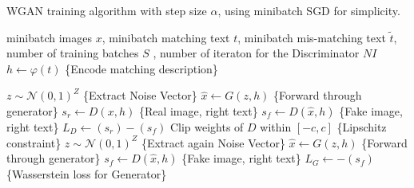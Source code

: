 \begin{algorithm}
    \caption{WGAN training algorithm with step size $\alpha$, using minibatch SGD for simplicity.}
    \begin{algorithmic}
        \Require minibatch images $x$, minibatch matching text $t$, minibatch mis-matching text $\tilde{t}$, 
        number of training batches $S$ , number of iteraton for the Discriminator $NI$ 
            \State $h \leftarrow \varphi(t)$ \hfill \{Encode matching description\}
            
                \State $z \sim \mathcal{N}(0, 1)^Z$ \hfill \{Extract Noise Vector\}
                \State $\hat{x} \leftarrow G(z, h)$ \hfill \{Forward through generator\}
                \State $s_r \leftarrow D(x, h)$ \hfill \{Real image, right text\}
                \State $s_f \leftarrow D(\hat{x}, h)$ \hfill \{Fake image, right text\}
                \State $L_D \leftarrow (s_r) - (s_f) $
                \State Clip weights of $D$ within $[-c, c]$
                \State \{Lipschitz constraint\}
            \EndFor
            \State $z \sim \mathcal{N}(0, 1)^Z$ \hfill \{Extract again Noise Vector\}
            \State $\hat{x} \leftarrow G(z, h)$ \hfill \{Forward through generator\}
            \State $s_f \leftarrow D(\hat{x}, h)$ \hfill \{Fake image, right text\}
            \State $L_G \leftarrow -(s_f) $ \hfill \{Wasserstein loss for Generator\}
            \EndFor
    \end{algorithmic}
\end{algorithm}

